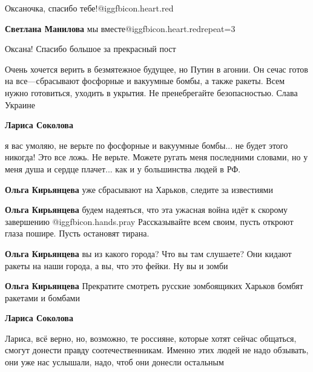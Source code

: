  
 
 
 
 
\zzSecCmt

\begin{itemize} %
Оксаночка, спасибо тебе!@igg{fbicon.heart.red}

\textbf{Светлана Манилова} мы вместе@igg{fbicon.heart.red}{repeat=3}

Оксана!
Спасибо большое за прекрасный пост


Очень хочется верить в безмятежное будущее, но Путин в агонии. Он сечас готов на
все—сбрасывают фосфорные и вакуумные бомбы, а также ракеты. Всем нужно
готовиться, уходить в укрытия. Не пренебрегайте безопасностью. Слава Украине

\begin{itemize} %
\textbf{Лариса Соколова} 

я вас умоляю, не верьте по фосфорные и вакуумные бомбы... не будет этого
никогда! Это все ложь. Не верьте. Можете ругать меня последними словами, но у
меня душа и сердце плачет... как и у большинства людей в РФ.

\begin{itemize} %
\textbf{Ольга Кирьянцева} уже сбрасывают на Харьков, следите за известиями

\textbf{Ольга Кирьянцева}
будем надеяться, что эта ужасная война идёт к скорому завершению @igg{fbicon.hands.pray} 
Рассказывайте всем своим, пусть откроют глаза пошире. Пусть остановят тирана.

\textbf{Ольга Кирьянцева} вы из какого города? Что вы там слушаете? Они кидают ракеты на наши города, а вы, что это фейки. Ну вы и зомби

\textbf{Ольга Кирьянцева} Прекратите смотреть русские зомбоящиких Харьков бомбят ракетами и бомбами

\textbf{Лариса Соколова} 

Лариса, всё верно, но, возможно, те россияне, которые хотят сейчас общаться,
смогут донести правду соотечественникам.  Именно этих людей не надо обзывать,
они уже нас услышали, надо, чтоб они донесли остальным


\end{itemize}
\end{itemize}
\end{itemize}
